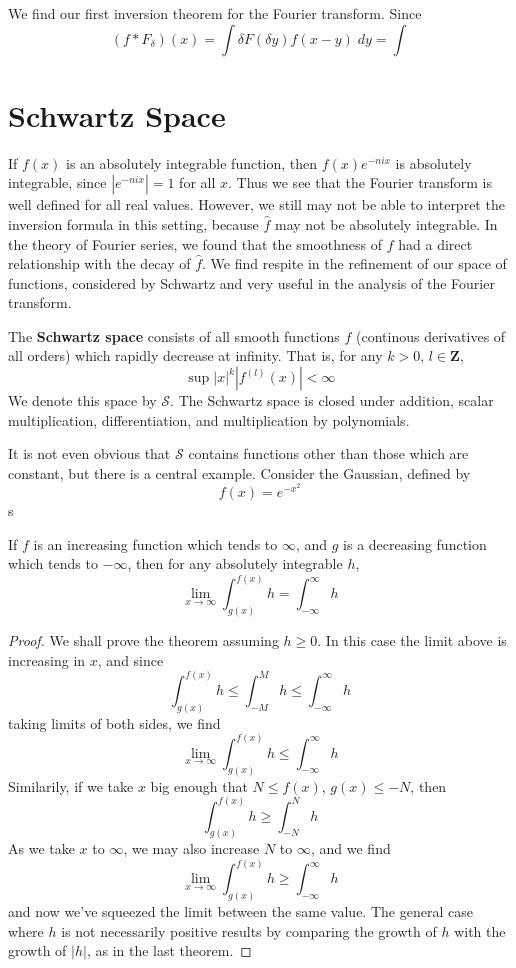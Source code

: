 We find our first inversion theorem for the Fourier transform. Since
%
\[ (f * F_\delta)(x) = \int \delta F(\delta y) f(x - y)\; dy = \int  \]


\section{Schwartz Space}

If $f(x)$ is an absolutely integrable function, then $f(x) e^{-nix}$ is absolutely integrable, since $|e^{-nix}| = 1$ for all $x$. Thus we see that the Fourier transform is well defined for all real values. However, we still may not be able to interpret the inversion formula in this setting, because $\widehat{f}$ may not be absolutely integrable. In the theory of Fourier series, we found that the smoothness of $f$ had a direct relationship with the decay of $\widehat{f}$. We find respite in the refinement of our space of functions, considered by Schwartz and very useful in the analysis of the Fourier transform.

The {\bf Schwartz space} consists of all smooth functions $f$ (continous derivatives of all orders) which rapidly decrease at infinity. That is, for any $k > 0$, $l \in \mathbf{Z}$,
%
\[ \sup |x|^k |f^{(l)}(x)| < \infty \]
%
We denote this space by $\mathcal{S}$. The Schwartz space is closed under addition, scalar multiplication, differentiation, and multiplication by polynomials.

It is not even obvious that $\mathcal{S}$ contains functions other than those which are constant, but there is a central example. Consider the Gaussian, defined by
%
\[ f(x) = e^{-x^2} \]
%
s

\begin{lemma}
    If $f$ is an increasing function which tends to $\infty$, and $g$ is a decreasing function which tends to $-\infty$, then for any absolutely integrable $h$,
    \[ \lim_{x \to \infty} \int_{g(x)}^{f(x)} h = \int_{-\infty}^\infty h \]
\end{lemma}
\begin{proof}
    We shall prove the theorem assuming $h \geq 0$. In this case the limit above is increasing in $x$, and since
    \[ \int_{g(x)}^{f(x)} h \leq \int_{-M}^{M} h \leq \int_{-\infty}^\infty h \]
    taking limits of both sides, we find
    \[ \lim_{x \to \infty}  \int_{g(x)}^{f(x)} h \leq \int_{-\infty}^\infty h \]
    Similarily, if we take $x$ big enough that $N \leq f(x)$, $g(x) \leq -N$, then
    \[ \int_{g(x)}^{f(x)} h \geq \int_{-N}^N h \]
    As we take $x$ to $\infty$, we may also increase $N$ to $\infty$, and we find
    \[ \lim_{x \to \infty} \int_{g(x)}^{f(x)} h \geq \int_{-\infty}^\infty h \]
    and now we've squeezed the limit between the same value. The general case where $h$ is not necessarily positive results by comparing the growth of $h$ with the growth of $|h|$, as in the last theorem.
\end{proof}

